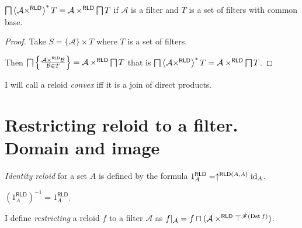 \begin{cor}
$\bigsqcap\left\langle \mathcal{A}\times^{\mathsf{RLD}}\right\rangle ^{\ast}T=\mathcal{A}\times^{\mathsf{RLD}}\bigsqcap T$
if $\mathcal{A}$ is a filter and $T$ is a set of filters with common
base.\end{cor}
\begin{proof}
Take $S=\{\mathcal{A}\}\times T$ where $T$ is a set of filters.

Then $\bigsqcap\left\{ \frac{\mathcal{A}\times^{\mathsf{RLD}}\mathcal{B}}{\mathcal{B}\in T}\right\}=\mathcal{A}\times^{\mathsf{RLD}}\bigsqcap T$
that is $\bigsqcap\left\langle \mathcal{A}\times^{\mathsf{RLD}}\right\rangle ^{\ast}T=\mathcal{A}\times^{\mathsf{RLD}}\bigsqcap T$.\end{proof}
\begin{defn}
I will call a reloid \emph{convex} iff it is
a join of direct products.
\end{defn}

\section{Restricting reloid to a filter. Domain and image}
\begin{defn}
\emph{Identity reloid} for a set $A$ is defined
by the formula $1_{A}^{\mathsf{RLD}}=\uparrow^{\mathsf{RLD}(A,A)}\operatorname{id}_{A}$.\end{defn}
\begin{obvious}
$(1_{A}^{\mathsf{RLD}})^{-1}=1_{A}^{\mathsf{RLD}}$.\end{obvious}
\begin{defn}
I define \emph{restricting} a reloid $f$
to a filter $\mathcal{A}$ as $f|_{\mathcal{A}}=f\sqcap(\mathcal{A}\times^{\mathsf{RLD}}\top^{\mathscr{F}(\operatorname{Dst} f)})$.
\end{defn}

